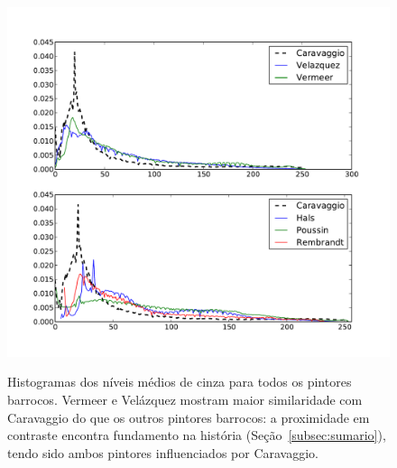 \begin{figure}[h!]
\begin{center}
      \caption{Histogramas dos níveis médios de cinza para todos os
        pintores barrocos. Vermeer e Velázquez mostram maior
        similaridade com Caravaggio do que os outros pintores
        barrocos: a proximidade em contraste encontra fundamento na
        história (Seção~\ref{subsec:sumario}), tendo sido ambos
        pintores influenciados por Caravaggio.}
        \label{fig:chiaroscuro}
{    \centering
        \includegraphics[width=\columnwidth]{figs/chiaroscuro}}
       \fonteminha
  \end{center}
\end{figure}


